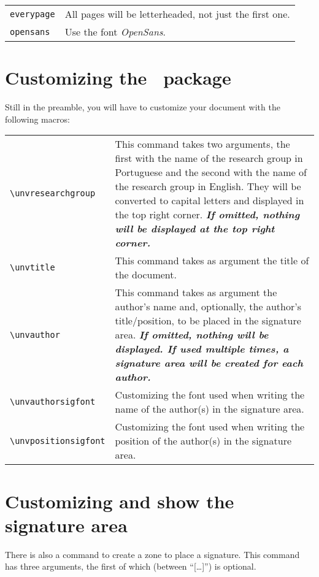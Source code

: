 \documentclass[a4paper,11pt]{article}
\newcommand*{\thePackage}{\texttt{\uninovaletterheadname}}
\begin{document}
\bgroup
\renewcommand{\arraystretch}{1.5}
\begin{xltabular}{\textwidth}{lX}
  \texttt{everypage} & All pages will be letterheaded, not just the first one.\\
  \texttt{opensans}  & Use the font \emph{OpenSans}.\\
\end{xltabular}
\egroup

\section{Customizing the \thePackage\ package}

Still in the preamble, you will have to customize your document with the following macros:

\bgroup
  \renewcommand{\arraystretch}{1.5}
  \begin{xltabular}{\textwidth}{lX}
    \verb+\unvresearchgroup+    & This command takes two arguments, the first with the name of the research group in Portuguese and the second with the name of the research group in English.  They will be converted to capital letters and displayed in the top right corner.  \textbf{\textsl{If omitted, nothing will be displayed at the top right corner.}}\\
    \verb+\unvtitle+            & This command takes as argument the title of the document.\\
    \verb+\unvauthor+           & This command takes as argument the author's name and, optionally, the author's title/position, to be placed in the signature area. \textbf{\textsl{If omitted, nothing will be displayed. If used multiple times, a signature area will be created for each author.}}\\
    \verb+\unvauthorsigfont+    &  Customizing the font used when writing the name of the author(s) in the signature area.\\
    \verb+\unvpositionsigfont+  &  Customizing the font used when writing the position of the author(s) in the signature area.\\
  \end{xltabular}
\egroup

\section{Customizing and show the signature area}

There is also a command to create a zone to place a signature. This command has three arguments, the first of which (between “[…]”) is optional.
\end{document}
